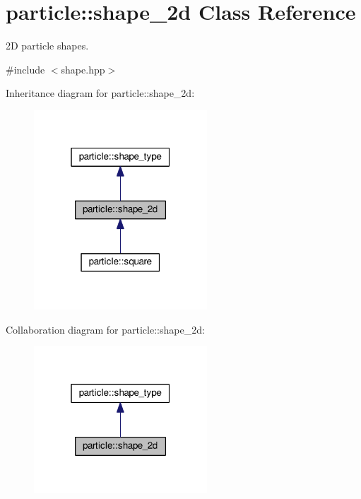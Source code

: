 \hypertarget{classparticle_1_1shape__2d}{}\section{particle\+:\+:shape\+\_\+2d Class Reference}
\label{classparticle_1_1shape__2d}


2D particle shapes.  




{\ttfamily \#include $<$shape.\+hpp$>$}



Inheritance diagram for particle\+:\+:shape\+\_\+2d\+:
\nopagebreak
\begin{figure}[H]
\begin{center}
\leavevmode
\includegraphics[width=184pt]{d4/ddf/classparticle_1_1shape__2d__inherit__graph}
\end{center}
\end{figure}


Collaboration diagram for particle\+:\+:shape\+\_\+2d\+:
\nopagebreak
\begin{figure}[H]
\begin{center}
\leavevmode
\includegraphics[width=184pt]{db/d07/classparticle_1_1shape__2d__coll__graph}
\end{center}
\end{figure}
